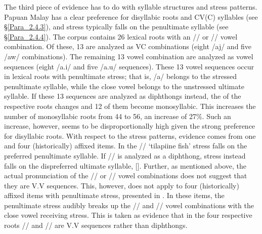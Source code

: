 The third piece of evidence has to do with syllable structures and stress patterns. Papuan Malay has a clear preference for disyllabic roots and CV(C) syllables (see §\ref{Para_2.4.3}), and stress typically falls on the penultimate syllable (see §\ref{Para_2.4.4}). The corpus contains 26 lexical roots with an // or // vowel combination. Of these, 13 are analyzed as VC combinations (eight /aj/ and five /aw/ combinations). The remaining 13 vowel combination are analyzed as vowel sequences (eight /a.i/ and five /a.u/ sequences). These 13 vowel sequences occur in lexical roots with penultimate stress; that is, /a/ belongs to the stressed penultimate syllable, while the close vowel belongs to the unstressed ultimate syllable. If these 13 sequences are analyzed as diphthongs instead, the  of the respective roots changes and 12 of them become monosyllabic. This increases the number of monosyllabic roots from 44 to 56, an increase of 27\%. Such an increase, however, seems to be disproportionally high given the strong preference for disyllabic roots. With respect to the stress patterns, evidence comes from one  and four (historically) affixed items. In the   // ‘tilapiine fish’ stress falls on the preferred penultimate syllable. If // is analyzed as a diphthong, stress instead falls on the dispreferred ultimate syllable, []. Further, as mentioned above, the actual pronunciation of the // or // vowel combinations does not suggest that they are V.V sequences. This, however, does not apply to four (historically) affixed items with penultimate stress, presented in . In these items, the penultimate stress audibly breaks up the // and // vowel combinations with the close vowel receiving stress. This is taken as evidence that in the four respective roots // and // are V.V sequences rather than diphthongs.

